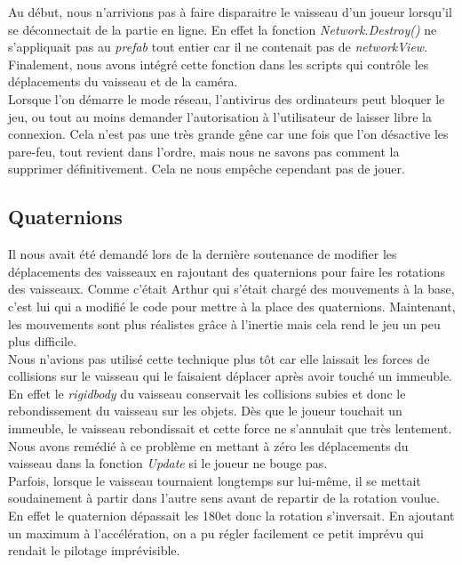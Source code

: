 \documentclass[10pt, titlepage]{report}
\begin{document}
Au début, nous n'arrivions pas à faire disparaitre le vaisseau d'un joueur lorsqu'il se déconnectait de la partie en ligne. En effet la fonction \textit{Network.Destroy()} ne s'appliquait pas au \textit{prefab} tout entier car il ne contenait pas de \textit{networkView}. Finalement, nous avons intégré cette fonction dans les scripts qui contrôle les déplacements du vaisseau et de la caméra.\\

Lorsque l'on démarre le mode réseau, l'antivirus des ordinateurs peut bloquer le jeu, ou tout au moins demander l'autorisation à l'utilisateur de laisser libre la connexion. Cela n'est pas une très grande gêne car une fois que l'on désactive les pare-feu, tout revient dans l'ordre, mais nous ne savons pas comment la supprimer définitivement. Cela ne nous empêche cependant pas de jouer.\\

\subsection{Quaternions}
Il nous avait été demandé lors de la dernière soutenance de modifier les déplacements des vaisseaux en rajoutant des quaternions pour faire les rotations des vaisseaux. Comme c'était Arthur qui s'était chargé des mouvements à la base, c'est lui qui a modifié le code pour mettre à la place des quaternions. Maintenant, les mouvements sont plus réalistes grâce à l'inertie mais cela rend le jeu un peu plus difficile.\\

Nous n'avions pas utilisé cette technique plus tôt car elle laissait les forces de collisions sur le vaisseau qui le faisaient déplacer après avoir touché un immeuble. En effet le \textit{rigidbody} du vaisseau conservait les collisions subies et donc le rebondissement du vaisseau sur les objets. Dès que le joueur touchait un immeuble, le vaisseau rebondissait et cette force ne s'annulait que très lentement. Nous avons remédié à ce problème en mettant à zéro les déplacements du vaisseau dans la fonction \textit{Update} si le joueur ne bouge pas.\\

Parfois, lorsque le vaisseau tournaient longtemps sur lui-même, il se mettait soudainement à partir dans l'autre sens avant de repartir de la rotation voulue. En effet le quaternion dépassait les 180\textdegree  et donc la rotation s'inversait. En ajoutant un maximum à l'accélération, on a pu régler facilement ce petit imprévu qui rendait le pilotage imprévisible.\\
\end{document}
